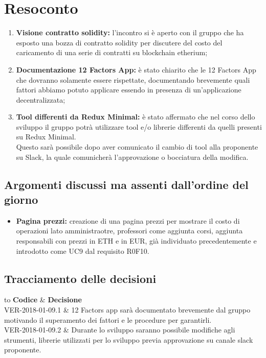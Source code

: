 \documentclass[VER-2018-01-09.tex]{subfiles}
\begin{document}
\chapter{Resoconto}
\begin{enumerate}
	\item \textbf{Visione contratto solidity:} l'incontro si è aperto con il gruppo \gruppo{} che ha esposto una bozza di contratto solidity per discutere del costo del caricamento di una serie di contratti su blockchain etherium;
	
	\item \textbf{Documentazione 12 Factors App:} è stato chiarito che le 12 Factors App che dovranno solamente essere rispettate, documentando brevemente quali fattori abbiamo potuto applicare essendo in presenza di un'applicazione decentralizzata;
	
	\item \textbf{Tool differenti da Redux Minimal:} è stato affermato che nel corso dello sviluppo il gruppo potrà utilizzare tool e/o librerie differenti da quelli presenti su Redux Minimal.\\
	Questo sarà possibile dopo aver comunicato il cambio di tool alla proponente su Slack, la quale comunicherà l'approvazione o bocciatura della modifica.
\end{enumerate}
\section{Argomenti discussi ma assenti dall'ordine del giorno}
\begin{itemize}
	\item \textbf{Pagina prezzi:} creazione di una pagina prezzi per mostrare il costo di operazioni lato amministraotre, professori come aggiunta corsi, aggiunta responsabili con prezzi in ETH e in EUR, già individuato precedentemente e introdotto come UC9 dal requisito R0F10.
\end{itemize}
\section{Tracciamento delle decisioni}
\begin{table}[H]
	\begin{center}
		\begin{tabu} to 
			\tableHeaderStyle
			\textbf{Codice} & \textbf{Decisione} \\
			VER-2018-01-09.1 & 12 Factors app sarà documentato brevemente dal gruppo motivando il superamento dei fattori e le procedure per garantirli. \\
			VER-2018-01-09.2 & Durante lo sviluppo saranno possibile modifiche agli strumenti, librerie utilizzati per lo sviluppo previa approvazione su canale slack proponente. \\
		\end{tabu}
	\caption{Tracciamento delle decisioni del verbale}
	\end{center}
\end{table}
\end{document}
